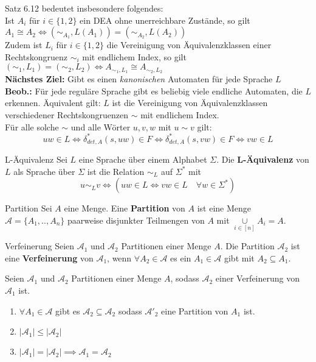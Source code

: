
Satz 6.12 bedeutet insbesondere folgendes:\\
Ist $A_i$ für $i \in \{1, 2\}$ ein DEA ohne unerreichbare Zustände, so gilt $A_1 \cong A_2 \iff (\sim_{A_1}, L(A_1)) = (\sim_{A_2}, L(A_2))$\\
Zudem ist $L_i$ für $i \in \{1, 2\}$ die Vereinigung von Äquivalenzklassen einer Rechtskongruenz $\sim_i$ mit endlichem Index, so gilt $(\sim_1, L_1) = (\sim_2, L_2) \iff A_{\sim_1, L_1} \cong A_{\sim_2, L_2}$\\

\textbf{Nächstes Ziel:} Gibt es einen \textit{kanonischen} Automaten für jede Sprache $L$\\

\textbf{Beob.:} Für jede reguläre Sprache gibt es beliebig viele endliche Automaten, die $L$ erkennen. Äquivalent gilt: $L$ ist die Vereinigung von Äquivalenzklassen verschiedener Rechtskongruenzen $\sim$ mit endlichem Index.\\
Für alle solche $\sim$ und alle Wörter $u, v, w$ mit $u \sim v$ gilt:
$$uw \in L \iff \delta^*_{det, A}(s, uw) \in F \iff \delta^*_{det, A}(s, vw) \in F \iff vw \in L$$

\begin{defn}{L-Äquivalenz}
    Sei $L$ eine Sprache über einem Alphabet $\Sigma$. Die \textbf{L-Äquivalenz} von $L$ als Sprache über $\Sigma$ ist die Relation $\sim_L$ auf $\Sigma^*$ mit
    $$u \sim_L v \iff (uw \in L \iff vw \in L \quad \forall w \in \Sigma^*)$$
\end{defn}

\begin{defn}{Partition}
    Sei $A$ eine Menge. Eine \textbf{Partition} von $A$ ist eine Menge $\mathcal{A} = \{A_1, .., A_n\}$ paarweise disjunkter Teilmengen von $A$ mit $\underset{i \in [n]}{\cup} A_i = A$.
\end{defn}

\begin{defn}{Verfeinerung}
    Seien $\mathcal{A}_1$ und $\mathcal{A}_2$ Partitionen einer Menge $A$. Die Partition $\mathcal{A}_2$ ist eine \textbf{Verfeinerung} von $\mathcal{A}_1$, wenn $\forall A_2 \in \mathcal{A}$ es ein $A_1 \in \mathcal{A}$ gibt mit $A_2 \subseteq A_1$.
\end{defn}

\begin{bem}
    Seien $\mathcal{A}_1$ und $\mathcal{A}_2$ Partitionen einer Menge $A$, sodass $\mathcal{A}_2$ einer Verfeinerung von $\mathcal{A}_1$ ist.
    
    \begin{enumerate}[label=(\roman*)]
        \item $\forall A_1 \in \mathcal{A}$ gibt es $\mathcal{A}_2 \subseteq \mathcal{A}_2$ sodass ${\mathcal{A}'}_2$ eine Partition von $A_1$ ist.
        \item $|\mathcal{A}_1| \leq |\mathcal{A}_2|$
        \item $| \mathcal{A}_1 | = |\mathcal{A}_2| \implies \mathcal{A}_1 = \mathcal{A}_2$
    \end{enumerate}
\end{bem}

